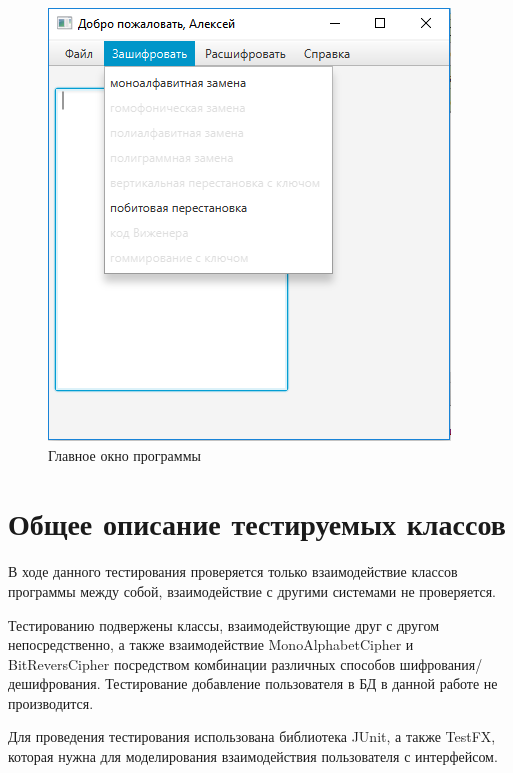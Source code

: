 \documentclass[a4paper,12pt]{article}
\begin{document}
\begin{center}
	\begin{figure}[h!]
		\centering
   		\includegraphics[scale=0.5]{img/main_form.png}
   		\caption{Главное окно программы}
   		\label{fig:main_form}
    \end{figure}
\end{center}

\newpage\section{Общее описание тестируемых классов}
В ходе данного тестирования проверяется только взаимодействие классов программы между собой, взаимодействие с другими системами не проверяется.

Тестированию подвержены классы, взаимодействующие друг с другом непосредственно, а также взаимодействие MonoAlphabetCipher и BitReversCipher посредством комбинации различных способов шифрования/дешифрования.
Тестирование добавление пользователя в БД в данной работе не производится.

Для проведения тестирования использована библиотека JUnit, а также TestFX, которая нужна для моделирования взаимодействия пользователя с интерфейсом.
\end{document}
